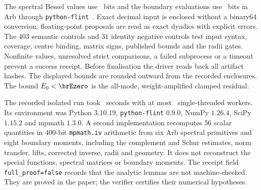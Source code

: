 \documentclass[11pt]{amsart}
\theoremstyle{definition}
\theoremstyle{remark}
\numberwithin{equation}{section}
\begin{document}
The spectral Bessel values use \brSpectralBits\ bits and the boundary
evaluations use \brTraceBits\ bits in Arb through
\texttt{python-flint}~\cite{flint,Joh17}. Exact decimal input is enclosed
without a binary64 conversion; floating-point proposals are read as exact
dyadics with explicit errors. The $403$ semantic controls and $31$ identity
negative controls test input syntax, coverage, centre binding, matrix signs,
published bounds and the radii gates. Nonfinite values, unresolved strict
comparisons, a failed subprocess or a timeout prevent a success receipt.
Before finalisation the driver reads back all artifact hashes. The displayed
bounds are rounded outward from the recorded enclosures.
The bound $E_0<\brEzero$ is the all-mode, weight-amplified clamped residual.

The recorded isolated run took \brRecordedSeconds\ seconds with at most
\brWorkers\ single-threaded workers. Its environment was Python $3.10.19$,
\texttt{python-flint} $0.9.0$, NumPy $1.26.4$, SciPy $1.15.2$ and mpmath
$1.3.0$. A second implementation recomputes $56$ scalar quantities in
$400$-bit \texttt{mpmath.iv} arithmetic from six Arb spectral primitives
and eight boundary moments, including the complement and Schur estimates,
norm transfer, lifts, corrected inverse, radii and geometry. It does not
reconstruct the special functions, spectral matrices or boundary moments.
The receipt field \texttt{full\_proof=false} records that the analytic
lemmas are not machine-checked. They are proved in the paper; the verifier
certifies their numerical hypotheses.
\end{document}
